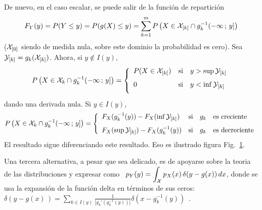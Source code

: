De nuevo, en el caso escalar, se puede salir de la funci\'on de repartici\'on
%
\[
F_Y(y) =  P(Y \le y) = P(  g(X) \le y )  = \sum_{k=1}^m P\left( X  \in \mathcal{X}_{[k]} \cap
  g_k^{-1}(-\infty \, ; \, y] \right)
\]
%
($\mathcal{X}_{[0]}$  siendo  de medida  nula,  sobre  este  dominio la  probabilidad  es
cero). Sea $\mathcal{Y}_{[k]} = g_k(\mathcal{X}_{[k]})$. Ahora, si $y \not\in I(y)$,
%
\[
P\left(   X   \in  \X_k   \cap   g_k^{-1}(-\infty  \,   ;   \,   y]  \right)   =
\left\{\begin{array}{lll}
%
P(X \in \X_{[k]}) & \mbox{si} & y > \sup \Y_{[k]}\\[2.5mm]
%
0 & \mbox{si} & y < \inf \Y_{[k]}\\[2.5mm]
\end{array}\right.
\]
%
dando una derivada nula. Si $y \in I(y)$,
%
\[
P\left(   X   \in  \X_k   \cap   g_k^{-1}(-\infty  \,   ;   \,   y]  \right)   =
\left\{\begin{array}{lll}
%
F_X(g_k^{-1}(y)) - F_X(\inf \Y_{[k]}) & \mbox{si} & g_k \quad \mbox{es creciente}\\[2.5mm]
%
F_X(\sup \Y_{[k]}) - F_X(g_k^{-1}(y))  & \mbox{si} & g_k \quad \mbox{es decreciente}
\end{array}\right.
\]
%
El  resultado  sigue  diferenciando  este  resultado. Eso  es  ilustrado  figura
Fig.~\ref{fig:MP:TransformacionVA}.

\begin{figure}[h!]
\begin{center}  \end{center}
%
\label{fig:MP:TransformacionVA}
\end{figure}

Una  tercera alternativa,  a pesar  que sea  delicado, es  de apoyarse  sobre la
teoria de las  distribuciones y expresar como \  $\displaystyle p_Y(y) = \int_{\mathcal{X}}
p_X(x) \,  \delta(y-g(x)) \, dx$,  donde se usa  la expansi\'on de  la funci\'on
delta  en  t\'erminos de  sus  ceros:  \  $\delta(y-g(x)\,)= \sum_{k  \in  I(y)}
\frac{1}{\left|      g_k'\left(      g_k^{-1}      (y)     \right)      \right|}
\delta(x-g_k^{-1}(y))$~\cite{ManWol95}.


